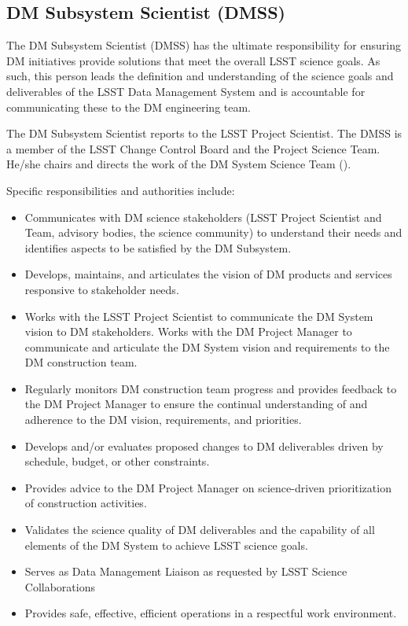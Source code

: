 \subsection{DM \gls{Subsystem Scientist} (\gls{DMSS}) \label{role:dmps} }

The DM \gls{Subsystem Scientist} (\gls{DMSS}) has the ultimate responsibility for ensuring DM initiatives provide solutions that meet the overall \gls{LSST} science goals. As such, this person leads the definition and understanding of the science goals and deliverables of the \gls{LSST} \gls{Data Management} System and is accountable for communicating these to the DM engineering team.

The DM \gls{Subsystem Scientist} reports to the \gls{LSST} \gls{Project Scientist}. The \gls{DMSS} is a member of the \gls{LSST} \gls{Change Control Board} and the \gls{Project Science Team}. He/she chairs and directs the work of the DM System Science Team ().

Specific responsibilities and authorities include:


\begin{itemize}
\item Communicates with \gls{DM} science stakeholders (\gls{LSST} \gls{Project Scientist} and Team, advisory bodies, the science community) to understand their needs and identifies aspects to be satisfied by the \gls{DM} \gls{Subsystem}.
\item Develops, maintains, and articulates the vision of \gls{DM} products and services responsive to stakeholder needs.
\item Works with the \gls{LSST} \gls{Project Scientist} to communicate the \gls{DM} System vision to \gls{DM} stakeholders. Works with the \gls{DM} \gls{Project Manager} to communicate and articulate the \gls{DM} System vision and requirements to the \gls{DM} construction team.
\item Regularly monitors \gls{DM} construction team progress and provides feedback to the \gls{DM} \gls{Project Manager} to ensure the continual understanding of and adherence to the \gls{DM} vision, requirements, and priorities.
\item Develops and/or evaluates proposed changes to \gls{DM} deliverables driven by schedule, budget, or other constraints.
\item Provides advice to the \gls{DM} \gls{Project Manager} on science-driven prioritization of construction activities.
\item Validates the science quality of \gls{DM} deliverables and the capability of all elements of the \gls{DM} System to achieve \gls{LSST} science goals.
\item Serves as \gls{Data Management} Liaison as requested by \gls{LSST} Science Collaborations
\item Provides safe, effective, efficient operations in a respectful work environment.
\end{itemize}

